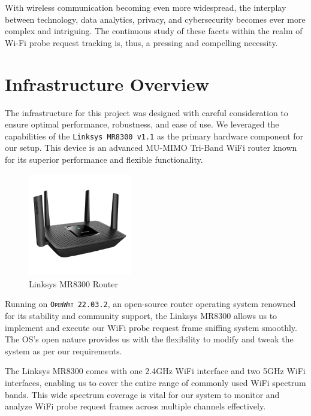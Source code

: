 \documentclass{article}
\begin{document}
With wireless communication becoming even more widespread, the interplay between technology, data analytics, privacy, and cybersecurity becomes ever more complex and intriguing. The continuous study of these facets within the realm of Wi-Fi probe request tracking is, thus, a pressing and compelling necessity.


\section{Infrastructure Overview}

The infrastructure for this project was designed with careful consideration to ensure optimal performance, robustness, and ease of use. We leveraged the capabilities of the \texttt{Linksys MR8300 v1.1} as the primary hardware component for our setup. This device is an advanced MU-MIMO Tri-Band WiFi router known for its superior performance and flexible functionality.

\begin{figure}[h]
    \centering
    \includegraphics[width=0.4\textwidth]{assets/linksys_mr800.png}
    \caption{Linksys MR8300 Router}
    \label{fig:router}
\end{figure}

Running on \texttt{\textsc{OpenWrt} 22.03.2}, an open-source router operating system renowned for its stability and community support, the Linksys MR8300 allows us to implement and execute our WiFi probe request frame sniffing system smoothly. The OS's open nature provides us with the flexibility to modify and tweak the system as per our requirements.

The Linksys MR8300 comes with one 2.4GHz WiFi interface and two 5GHz WiFi interfaces, enabling us to cover the entire range of commonly used WiFi spectrum bands. This wide spectrum coverage is vital for our system to monitor and analyze WiFi probe request frames across multiple channels effectively.
\end{document}
